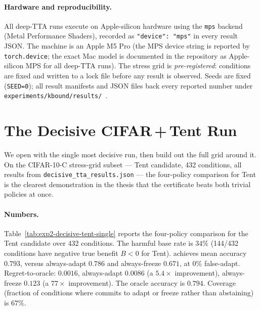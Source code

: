 \paragraph{Hardware and reproducibility.}
All deep-TTA runs execute on Apple-silicon hardware using the
\texttt{mps} backend (Metal Performance Shaders), recorded as
\texttt{"device": "mps"} in every result JSON.  The machine is an Apple M5
Pro (the MPS device string is reported by \texttt{torch.device}; the exact
Mac model is documented in the repository as Apple-silicon MPS for all
deep-TTA runs).  The stress grid is \emph{pre-registered}: conditions are
fixed and written to a lock file before any result is observed.  Seeds are
fixed (\texttt{SEED=0}); all result manifests and JSON files back every
reported number under
\texttt{experiments/kbound/results/}~\cite{kbound2026repo}.

\section{The Decisive CIFAR\,+\,Tent Run}\label{sec:exp2-cifar-tent}

We open with the single most decisive run, then build out the full grid around it.  On the
CIFAR-10-C stress-grid subset --- Tent candidate, 432 conditions, all results from
\texttt{decisive\_tta\_results.json} --- the four-policy comparison for Tent is the
clearest demonstration in the thesis that the certificate beats both trivial policies at
once.

\paragraph{Numbers.}
Table~\ref{tab:exp2-decisive-tent-single} reports the four-policy comparison
for the Tent candidate over 432 conditions.  The harmful base rate is $34\%$
(144/432 conditions have negative true benefit $B{<}0$ for Tent).
\KGA{} achieves mean accuracy $0.793$, versus always-adapt $0.786$ and
always-freeze $0.671$, at $0\%$ false-adapt.  Regret-to-oracle: \KGA{}
$0.0016$, always-adapt $0.0086$ (a $5.4{\times}$ improvement), always-freeze
$0.123$ (a $77{\times}$ improvement).  The oracle accuracy is $0.794$.
Coverage (fraction of conditions where \KGA{} commits to adapt or freeze
rather than abstaining) is $67\%$.

